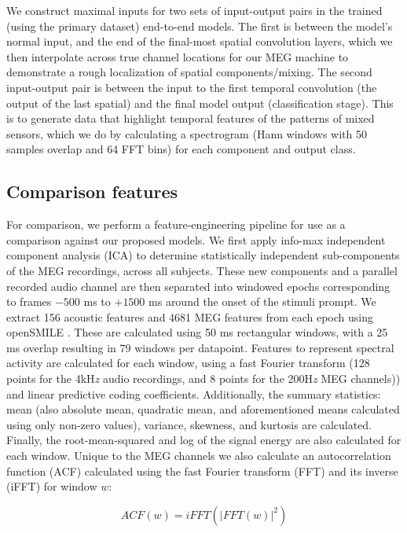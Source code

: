 \documentclass[fleqn,10pt]{wlscirep}
\begin{document}
We construct maximal inputs for two sets of input-output pairs in the trained (using the primary dataset) end-to-end models. The first is between the model's normal input, and the end of the final-most spatial convolution layers, which we then interpolate across true channel locations for our MEG machine to demonstrate a rough localization of spatial components/mixing. The second input-output pair is between the input to the first temporal convolution (the output of the last spatial) and the final model output (classification stage). This is to generate data that highlight temporal features of the patterns of mixed sensors, which we do by calculating a spectrogram (Hann windows with 50 samples overlap and 64 FFT bins) for each component and output class.

\subsection*{Comparison features}

For comparison, we perform a feature-engineering pipeline for use as a comparison against our proposed models. We first apply info-max independent component analysis (ICA) \cite{Bell1995} to determine statistically independent sub-components of the MEG recordings, across all subjects. These new components and a parallel recorded audio channel are then separated into windowed epochs corresponding to frames $-500$ ms to $+1500$ ms around the onset of the stimuli prompt. We extract 156 acoustic features and 4681 MEG features from each epoch using openSMILE \cite{Eyben13-RDI}. These are calculated using 50 ms rectangular windows, with a 25 ms overlap resulting in 79 windows per datapoint. Features to represent spectral activity are calculated for each window, using a fast Fourier transform (128 points for the 4kH{\em z} audio recordings, and 8 points for the 200H{\em z} MEG channels)) and linear predictive coding coefficients. Additionally, the summary statistics: mean (also absolute mean, quadratic mean, and aforementioned means calculated using only non-zero values), variance, skewness, and kurtosis are calculated. Finally, the root-mean-squared and log of the signal energy are also calculated for each window. Unique to the MEG channels we also calculate an autocorrelation function (ACF) calculated using the fast Fourier transform (FFT) and its inverse (iFFT) for window $w$:

\begin{equation}
  ACF(w) = iFFT(|FFT(w)|^2)
  \label{eq1}
\end{equation}
\end{document}
